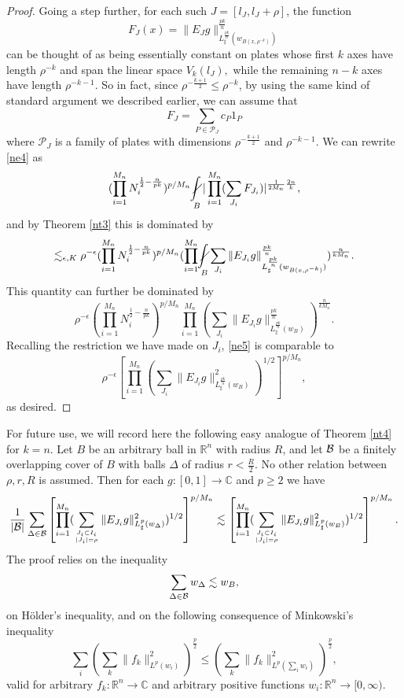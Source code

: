 \documentclass[amssymb,amsfonts,12pt]{amsart}
\def\R{{\mathbb R}}
\def\C{{\mathbb C}}
\def\P{{\mathcal P}}\def\J{{\mathcal J}}
\begin{document}
\begin{proof}
Going a step further, for each such $J=[l_J,l_J+\rho]$, the function
$$F_J(x)=\|E_{J}g\|_{L_{\sharp}^{\frac{pk}{n}}(w_{B(x,\rho^{-k})})}^{\frac{pk}n}$$
can be thought of as being essentially constant on plates whose first $k$ axes have length $\rho^{-k}$ and span the linear space
$V_k(l_J),$
while the remaining $n-k$ axes have length $\rho^{-k-1}$. So in fact, since $\rho^{-\frac{k+1}2}\le \rho^{-k}$, by using the same kind of  standard argument we described earlier, we can assume that
$$F_J=\sum_{P\in\P_J}c_P1_P$$
where $\P_J$ is a family of plates with dimensions $\rho^{-\frac{k+1}2}$ and $\rho^{-k-1}$. We can rewrite \eqref{ne4} as
$$(\prod_{i=1}^{M_n}N_i^{\frac12-\frac{n}{pk}})^{p/{M_n}}\nint_{B}|\prod_{i=1}^{M_n}(\sum_{J_i}F_{J_i})|^{\frac1{2{M_n}}\frac{2n}{k}},$$
and by Theorem \ref{nt3} this is dominated by
$$\lesssim_{\epsilon,K}\rho^{-\epsilon}(\prod_{i=1}^{M_n}N_i^{\frac12-\frac{n}{pk}})^{p/{M_n}}(\prod_{i=1}^{M_n}\nint_{B}\sum_{J_i}\|E_{J_i}g\|_{L_{\sharp}^{\frac{pk}{n}}(w_{B(x,\rho^{-k})})}^{\frac{pk}n})^{\frac{n}{kM_n}}.$$
This quantity can further be dominated by
\begin{equation}
\label{ne5}
\rho^{-\epsilon}(\prod_{i=1}^{M_n}N_i^{\frac12-\frac{n}{pk}})^{p/{M_n}}\prod_{i=1}^{M_n}(\sum_{J_i}\|E_{J_i}g\|_{L_{\sharp}^{\frac{pk}{n}}(w_B)}^{\frac{pk}n})^{\frac{n}{kM_n}}.
\end{equation}
Recalling the restriction we have made on $J_i$, \eqref{ne5} is comparable to
$$\rho^{-\epsilon}\left[\prod_{i=1}^{M_n}(\sum_{J_i}\|E_{J_i}g\|_{L_{\sharp}^{\frac{pk}{n}}(w_B)}^2)^{1/2}\right]^{p/M_n},$$
as desired.
\end{proof}
\bigskip

For future use, we will record here the following easy analogue of Theorem \ref{nt4} for $k=n$. Let $B$ be an arbitrary ball in $\R^n$ with radius $R$, and let ${\mathcal B}$ be a finitely overlapping cover of $B$ with balls $\Delta$ of radius $r<\frac{R}{2}$. No other relation between $\rho,r,R$ is assumed.  Then for each $g:[0,1]\to \C$ and $p\ge 2$  we have
\begin{equation}
\label{j nbyrtug8rt7g856uy956y9}
\frac1{|{\mathcal B}|}\sum_{\Delta\in{\mathcal B}}\left[\prod_{i=1}^{M_n}(\sum_{J_i\subset I_i\atop{|J_i|=\rho}}\|E_{J_i}g\|_{L_{\sharp}^{p}(w_\Delta)}^2)^{1/2}\right]^{p/{M_n}}\lesssim\left[\prod_{i=1}^{M_n}(\sum_{J_i\subset I_i\atop{|J_i|=\rho}}\|E_{J_i}g\|_{L_{\sharp}^{p}(w_B)}^2)^{1/2}\right]^{p/M_n}.
\end{equation}
The proof relies on the inequality
$$\sum_{\Delta\in{\mathcal B}}w_\Delta\lesssim w_B,$$
on H\"older's inequality, and on the following consequence of Minkowski's inequality
$$\sum_{i}(\sum_k\|f_k\|_{L^p(w_i)}^2)^{\frac{p}2}\le (\sum_k\|f_k\|_{L^p(\sum_iw_i)}^2)^{\frac{p}2},$$
valid for arbitrary $f_k:\R^n\to\C$ and arbitrary positive functions $w_i:\R^n\to [0,\infty)$.
\end{document}
